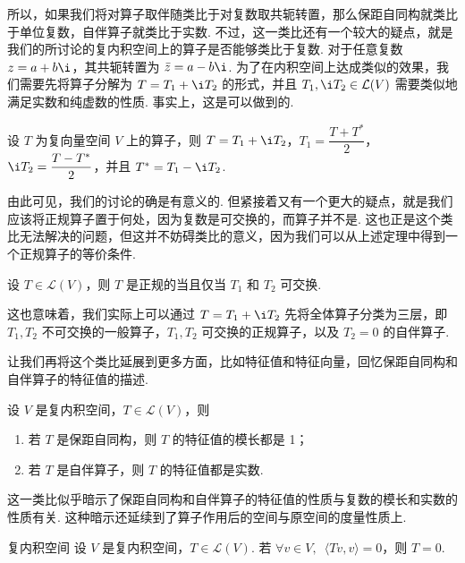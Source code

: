 所以，如果我们将对算子取伴随类比于对复数取共轭转置，那么保距自同构就类比于单位复数，自伴算子就类比于实数. 不过，这一类比还有一个较大的疑点，就是我们的所讨论的复内积空间上的算子是否能够类比于复数. 对于任意复数 $ z = a + b\i $，其共轭转置为 $ \bar{z} = a - b\i $. 为了在内积空间上达成类似的效果，我们需要先将算子分解为 $ T = T_1 + \i T_2 $ 的形式，并且 $ T_1, \i T_2 \in \mathcal{L}(V) $ 需要类似地满足实数和纯虚数的性质. 事实上，这是可以做到的.

\begin{theorem}{}{}
    设 $ T $ 为复向量空间 $ V $ 上的算子，则 $ T = T_1 + \i T_2 $，$ T_1 = \dfrac{T + T^*}{2} $，$ \i T_2 = \dfrac{T - T^*}{2} $，并且 $ T^* = T_1 - \i T_2 $.
\end{theorem}

由此可见，我们的讨论的确是有意义的. 但紧接着又有一个更大的疑点，就是我们应该将正规算子置于何处，因为复数是可交换的，而算子并不是. 这也正是这个类比无法解决的问题，但这并不妨碍类比的意义，因为我们可以从上述定理中得到一个正规算子的等价条件.

\begin{theorem}{}{}
    设 $ T \in \mathcal{L}(V) $，则 $ T $ 是正规的当且仅当 $ T_1 $ 和 $ T_2 $ 可交换.
\end{theorem}

这也意味着，我们实际上可以通过 $ T = T_1 + \i T_2 $ 先将全体算子分类为三层，即 $ T_1, T_2 $ 不可交换的一般算子，$ T_1, T_2 $ 可交换的正规算子，以及 $ T_2 = 0 $ 的自伴算子.

让我们再将这个类比延展到更多方面，比如特征值和特征向量，回忆保距自同构和自伴算子的特征值的描述.

\begin{theorem}{}{}
    设 $ V $ 是复内积空间，$ T \in \mathcal{L}(V) $，则
    \begin{enumerate}
        \item 若 $ T $ 是保距自同构，则 $ T $ 的特征值的模长都是 1；

        \item 若 $ T $ 是自伴算子，则 $ T $ 的特征值都是实数.
    \end{enumerate}
\end{theorem}

这一类比似乎暗示了保距自同构和自伴算子的特征值的性质与复数的模长和实数的性质有关. 这种暗示还延续到了算子作用后的空间与原空间的度量性质上.

\begin{theorem}{}{复内积空间}
    设 $ V $ 是复内积空间，$ T \in \mathcal{L}(V) $. 若 $ \forall v \in V,\enspace \langle Tv, v \rangle = 0 $，则 $ T = 0 $.
\end{theorem}

